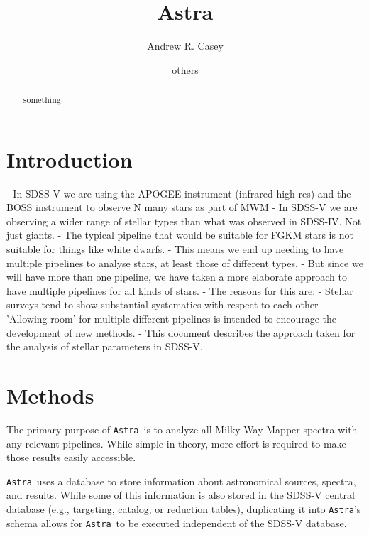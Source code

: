 \documentclass[modern]{aastex631}
\newcommand{\astra}{\texttt{Astra}}
\newcommand{\Astra}{\astra}
\begin{document}
\title{\Huge Astra}

\author[0000-0003-0174-0564]{Andrew R. Casey}

\author{others}

\begin{abstract}
something
\end{abstract}


\section*{}\clearpage
\section{Introduction}\label{sec:intro}
- In SDSS-V we are using the APOGEE instrument (infrared high res) and the BOSS instrument to observe N many stars as part of MWM
- In SDSS-V we are observing a wider range of stellar types than what was observed in SDSS-IV. Not just giants.
- The typical pipeline that would be suitable for FGKM stars is not suitable for things like white dwarfs.
- This means we end up needing to have multiple pipelines to analyse stars, at least those of different types.
- But since we will have more than one pipeline, we have taken a more elaborate approach to have multiple pipelines for all kinds of stars.
- The reasons for this are:
    - Stellar surveys tend to show substantial systematics with respect to each other
    - 'Allowing room' for multiple different pipelines is intended to encourage the development of new methods.
- This document describes the approach taken for the analysis of stellar parameters in SDSS-V.

\section{Methods}\label{sec:method}

The primary purpose of \Astra\ is to analyze all Milky Way Mapper spectra with any relevant pipelines. 
While simple in theory, more effort is required to make those results easily accessible.

\Astra\ uses a database to store information about astronomical sources, spectra, and results. 
While some of this information is also stored in the SDSS-V central database (e.g., targeting, catalog, or reduction tables),
duplicating it into \Astra's schema allows for \Astra\ to be executed independent of the SDSS-V database.
\end{document}

